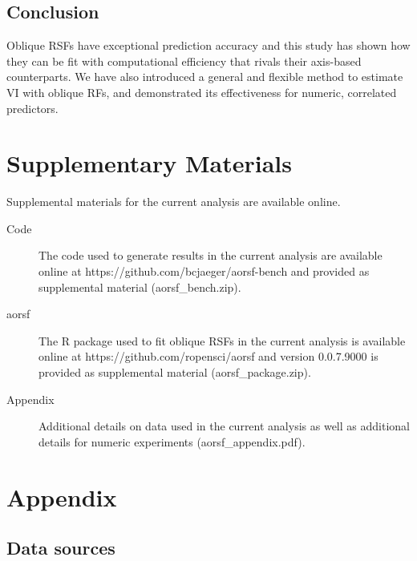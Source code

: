 \documentclass[12pt]{article}\usepackage[]{graphicx}\usepackage[]{xcolor}
\begin{document}
\subsection{Conclusion}

Oblique RSFs have exceptional prediction accuracy and this study has shown how they can be fit with computational efficiency that rivals their axis-based counterparts. We have also introduced a general and flexible method to estimate VI with oblique RFs, and demonstrated its effectiveness for numeric, correlated predictors.

\section{Supplementary Materials}

Supplemental materials for the current analysis are available online.

\begin{description}

\item[Code] The code used to generate results in the current analysis are available online at \newline https://github.com/bcjaeger/aorsf-bench and provided as supplemental material (aorsf\_bench.zip).

\item[aorsf] The R package used to fit oblique RSFs in the current analysis is available online at \newline https://github.com/ropensci/aorsf and version 0.0.7.9000 is provided as supplemental material (aorsf\_package.zip).

\item[Appendix] Additional details on data used in the current analysis as well as additional details for numeric experiments (aorsf\_appendix.pdf).

\end{description}





\newpage

\appendix

\section*{Appendix}
\captionsetup{labelformat=AppendixTables}
\setcounter{table}{0}

\subsection*{Data sources}
\end{document}
